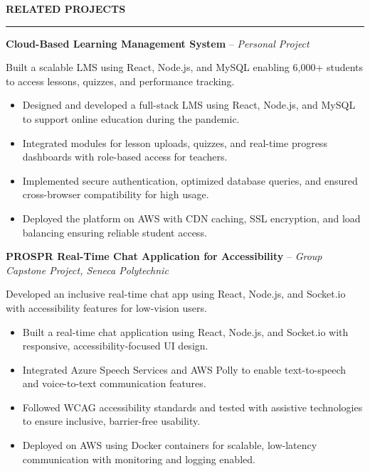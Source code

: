 \documentclass[10pt,letterpaper]{article}
\begin{document}
\vspace{6pt}

\textbf{RELATED PROJECTS}\\[-8pt]
\noindent\rule{\textwidth}{1pt}

\vspace{-2pt}

\textbf{Cloud-Based Learning Management System} -- \emph{Personal Project}

\vspace{-1pt}

Built a scalable LMS using React, Node.js, and MySQL enabling 6,000+ students to access lessons, quizzes, and performance tracking.
\vspace{-1pt}
\begin{itemize}
\item Designed and developed a full-stack LMS using React, Node.js, and MySQL to support online education during the pandemic.
\item Integrated modules for lesson uploads, quizzes, and real-time progress dashboards with role-based access for teachers.
\item Implemented secure authentication, optimized database queries, and ensured cross-browser compatibility for high usage.
\item Deployed the platform on AWS with CDN caching, SSL encryption, and load balancing ensuring reliable student access.
\end{itemize}

\textbf{PROSPR  Real-Time Chat Application for Accessibility} -- \emph{Group Capstone Project, Seneca Polytechnic}

\vspace{-1pt}

Developed an inclusive real-time chat app using React, Node.js, and Socket.io with accessibility features for low-vision users.
\vspace{-1pt}
\begin{itemize}
\item Built a real-time chat application using React, Node.js, and Socket.io with responsive, accessibility-focused UI design.
\item Integrated Azure Speech Services and AWS Polly to enable text-to-speech and voice-to-text communication features.
\item Followed WCAG accessibility standards and tested with assistive technologies to ensure inclusive, barrier-free usability.
\item Deployed on AWS using Docker containers for scalable, low-latency communication with monitoring and logging enabled.
\end{itemize}
\end{document}
